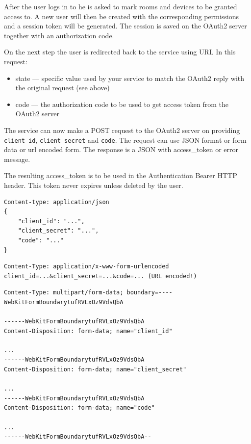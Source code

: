 After the user logs in to \zway he is asked to mark rooms and devices to be granted access to.
A new user will then be created with the corresponding permissions and a session token will be generated.
The session is saved on the \zwaveme OAuth2 server together with an authorization code.

On the next step the user is redirected back to the service using URL 
In this request:
\begin{itemize}
\item state --- specific value used by your service to match the OAuth2 reply with the original request (see above)
\item code --- the authorization code to be used to get access token from the OAuth2 server
\end{itemize}

The service can now make a POST request to the \zwaveme OAuth2 server on  providing \texttt{client\_id}, \texttt{client\_secret} and \texttt{code}.
The request can use JSON format or form data or url encoded form. The response is a JSON with access\_token or error message.

The resulting access\_token is to be used in the Authentication Bearer HTTP header.
This token never expires unless deleted by the user.

\begin{lstlisting}[caption=Request of Access token via Authorization code (JSON format),basicstyle=\small,columns=fullflexible]
Content-type: application/json
{
    "client_id": "...",
    "client_secret": "...",
    "code": "..."
}
\end{lstlisting}

\begin{lstlisting}[caption=Request of Access token via Authorization code (URL encoded form),basicstyle=\small,columns=fullflexible]
Content-Type: application/x-www-form-urlencoded
client_id=...&client_secret=...&code=... (URL encoded!)
\end{lstlisting}

\begin{lstlisting}[caption=Request of Access token via Authorization code (form data),basicstyle=\small,columns=fullflexible]
Content-Type: multipart/form-data; boundary=----WebKitFormBoundarytufRVLxOz9VdsQbA

------WebKitFormBoundarytufRVLxOz9VdsQbA
Content-Disposition: form-data; name="client_id"

...
------WebKitFormBoundarytufRVLxOz9VdsQbA
Content-Disposition: form-data; name="client_secret"

...
------WebKitFormBoundarytufRVLxOz9VdsQbA
Content-Disposition: form-data; name="code"

...
------WebKitFormBoundarytufRVLxOz9VdsQbA--
\end{lstlisting}

